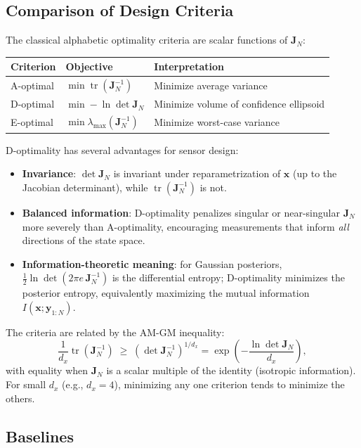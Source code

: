 \documentclass[11pt,a4paper]{article}
\newcommand{\tr}{\operatorname{tr}}
\begin{document}
\subsection{Comparison of Design Criteria}

The classical alphabetic optimality criteria are scalar functions of $\bm{J}_N$:
\begin{center}
\begin{tabular}{@{}lll@{}}
\toprule
Criterion & Objective & Interpretation \\
\midrule
A-optimal & $\min \tr(\bm{J}_N^{-1})$ & Minimize average variance \\
D-optimal & $\min -\ln\det\bm{J}_N$ & Minimize volume of confidence ellipsoid \\
E-optimal & $\min \lambda_{\max}(\bm{J}_N^{-1})$ & Minimize worst-case variance \\
\bottomrule
\end{tabular}
\end{center}

D-optimality has several advantages for sensor design:
\begin{itemize}[nosep]
  \item \textbf{Invariance}: $\det\bm{J}_N$ is invariant under reparametrization of $\bm{x}$ (up to the Jacobian determinant), while $\tr(\bm{J}_N^{-1})$ is not.
  \item \textbf{Balanced information}: D-optimality penalizes singular or near-singular $\bm{J}_N$ more severely than A-optimality, encouraging measurements that inform \emph{all} directions of the state space.
  \item \textbf{Information-theoretic meaning}: for Gaussian posteriors, $\frac{1}{2}\ln\det(2\pi e\,\bm{J}_N^{-1})$ is the differential entropy; D-optimality minimizes the posterior entropy, equivalently maximizing the mutual information $I(\bm{x}; \bm{y}_{1:N})$.
\end{itemize}

The criteria are related by the AM-GM inequality:
\begin{equation}
  \frac{1}{d_x}\tr(\bm{J}_N^{-1}) \;\geq\; \left(\det \bm{J}_N^{-1}\right)^{1/d_x} = \exp\!\left(-\frac{\ln\det\bm{J}_N}{d_x}\right),
\end{equation}
with equality when $\bm{J}_N$ is a scalar multiple of the identity (isotropic information).  For small $d_x$ (e.g., $d_x = 4$), minimizing any one criterion tends to minimize the others.

\subsection{Baselines}
\end{document}
